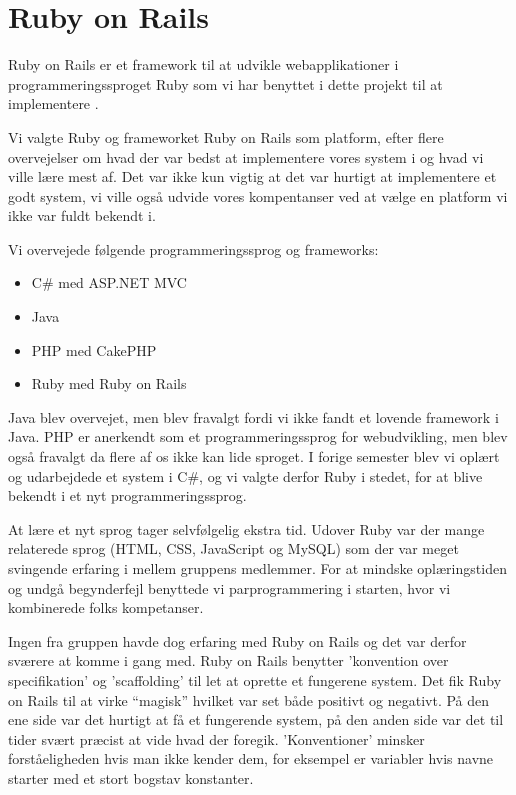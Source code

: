 ﻿\chapter{Ruby on Rails}
\label{akademiskror}

Ruby on Rails er et framework til at udvikle webapplikationer i programmeringssproget Ruby som vi har benyttet i dette projekt til at implementere {\Foodl}.

Vi valgte Ruby og frameworket Ruby on Rails som platform, efter flere overvejelser om hvad der var bedst at implementere vores system i og hvad vi ville lære mest af. Det var ikke kun vigtig at det var hurtigt at implementere et godt system, vi ville også udvide vores kompentanser ved at vælge en platform vi ikke var fuldt bekendt i.

Vi overvejede følgende programmeringssprog og frameworks:
\begin{itemize}
\item C\# med ASP.NET MVC
\item Java
\item PHP med CakePHP
\item Ruby med Ruby on Rails
\end{itemize}

Java blev overvejet, men blev fravalgt fordi vi ikke fandt et lovende framework i Java. PHP er anerkendt som et programmeringssprog for webudvikling, men blev også fravalgt da flere af os ikke kan lide sproget. I forige semester blev vi oplært og udarbejdede et system i C\#, og vi valgte derfor Ruby i stedet, for at blive bekendt i et nyt programmeringssprog.

At lære et nyt sprog tager selvfølgelig ekstra tid. Udover Ruby var der mange relaterede sprog (HTML, CSS, JavaScript og MySQL) som der var meget svingende erfaring i mellem gruppens medlemmer. For at mindske oplæringstiden og undgå begynderfejl benyttede vi parprogrammering i starten, hvor vi kombinerede folks kompetanser.

Ingen fra gruppen havde dog erfaring med Ruby on Rails og det var derfor sværere at komme i gang med. Ruby on Rails benytter 'konvention over specifikation' og 'scaffolding' til let at oprette et fungerene system. Det fik Ruby on Rails til at virke ``magisk'' hvilket var set både positivt og negativt. På den ene side var det hurtigt at få et fungerende system, på den anden side var det til tider svært præcist at vide hvad der foregik. 'Konventioner' minsker forståeligheden hvis man ikke kender dem, for eksempel er variabler hvis navne starter med et stort bogstav konstanter.


